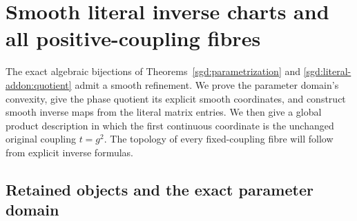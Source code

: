 
\section{Smooth literal inverse charts and all positive-coupling fibres}
\label{sgd:smooth-addon:section}

The exact algebraic bijections of
Theorems~\ref{sgd:parametrization} and
\ref{sgd:literal-addon:quotient} admit a smooth refinement.
We prove the parameter domain's convexity, give the phase quotient
its explicit smooth coordinates, and construct smooth inverse maps
from the literal matrix entries. We then give a global product
description in which the first continuous coordinate is the unchanged
original coupling $t=g^2$. The topology of every fixed-coupling fibre
will follow from explicit inverse formulas.

\subsection{Retained objects and the exact parameter domain}

